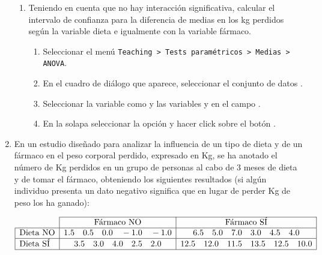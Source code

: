 \begin{enumerate}[leftmargin=*]
\begin{enumerate}


\item Teniendo en cuenta que no hay interacción significativa, calcular el intervalo de confianza para la diferencia de
medias en los kg perdidos según la variable dieta e igualmente con la variable fármaco.
\begin{indicacion}
\begin{enumerate}
\item Seleccionar el menú \texttt{Teaching > Tests paramétricos > Medias > ANOVA}.
\item En el cuadro de diálogo que aparece, seleccionar el conjunto de datos .
\item Seleccionar la variable  como  y las variables  y  en el campo .
\item En la solapa  seleccionar la opción  y hacer
click sobre el botón .
\end{enumerate}
\end{indicacion}
\end{enumerate}


\item En un estudio diseñado para analizar la influencia de un tipo de dieta y de un fármaco en el peso corporal
perdido, expresado en Kg, se ha anotado el número de Kg perdidos en un grupo de personas al cabo de 3 meses de dieta y
de tomar el fármaco, obteniendo los siguientes resultados (si algún individuo presenta un dato negativo significa que en
lugar de perder Kg de peso los ha ganado):

\[
\begin{array}{|l|c|c|}
\cline{2-3}
\multicolumn{1}{l|}{} & \text{Fármaco NO} & \text{Fármaco SÍ} \\
\hline
\text{Dieta NO} & 1.5\quad 0.5\quad 0.0\quad -1.0\quad -1.0 & 6.5\quad 5.0\quad 7.0\quad 3.0\quad 4.5\quad 4.0 \\
\hline
\text{Dieta SÍ} & 3.5\quad 3.0\quad 4.0\quad 2.5\quad 2.0 & 12.5\quad 12.0\quad 11.5\quad 13.5\quad 12.5\quad 10.0 \\
\hline
\end{array}
\]


\end{enumerate}
